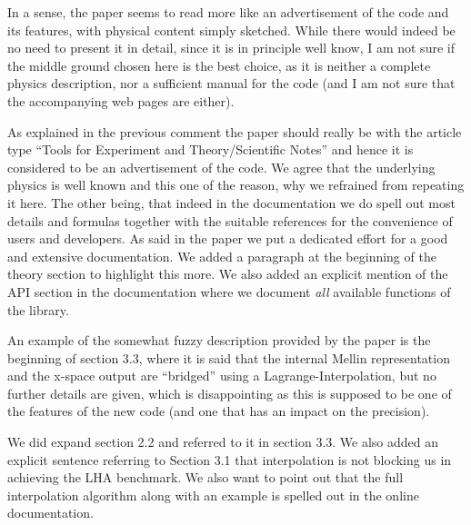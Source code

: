 \documentclass[a4paper,11pt]{article}
\newcounter{comment}[section]
\begin{document}
\begin{response}{
In a sense, the paper seems to read more like an advertisement of the code and
its features, with physical content simply sketched. While there would indeed be
no need to present it in detail, since it is in principle well know, I am not
sure if the middle ground chosen here is the best choice, as it is neither a
complete physics description, nor a sufficient manual for the code
(and I am not sure that the accompanying web pages are either).}

As explained in the previous comment the paper should really be with the article type
\enquote{Tools for Experiment and Theory/Scientific Notes} and hence it is considered
to be an advertisement of the code. We agree that the underlying physics is well known
and this one of the reason, why we refrained from repeating it here.
The other being, that indeed in the documentation we do spell out most details and formulas together with the suitable
references for the convenience of users and developers. As said in the paper we put
a dedicated effort for a good and extensive documentation. We added a paragraph at the beginning
of the theory section to highlight this more. We also added an explicit mention of the
API section in the documentation where we document \textit{all} available functions of the library.

\end{response}



\begin{response}{An example of the somewhat fuzzy description provided by the paper is the
beginning of section 3.3, where it is said that the internal Mellin
representation and the x-space output are ``bridged'' using a
Lagrange-Interpolation, but no further details are given, which is disappointing
as this is supposed to be one of the features of the new code (and one that has
an impact on the precision).}

We did expand section 2.2 and referred to it in section 3.3. We also added an explicit sentence
referring to Section 3.1 that interpolation is not blocking us in achieving the LHA benchmark.
We also want to point out that the full interpolation algorithm along with an example is spelled out
in the online documentation.

\end{response}
\end{document}
